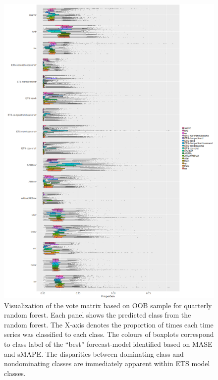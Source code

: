 \documentclass[11pt,a4paper,]{article}
\begin{document}
\begin{figure}
\centering
\includegraphics{figures/oobquarterly-1.png}
\caption{\label{fig:oobquarterly}Visualization of the vote matrix based on OOB sample for quarterly random forest. Each panel shows the predicted class from the random forest. The X-axis denotes the proportion of times each time series was classified to each class. The colours of boxplots correspond to class label of the ``best'' forecast-model identified based on MASE and sMAPE. The disparities between dominating class and nondominating classes are immediately apparent within ETS model classes.}
\end{figure}
\end{document}
